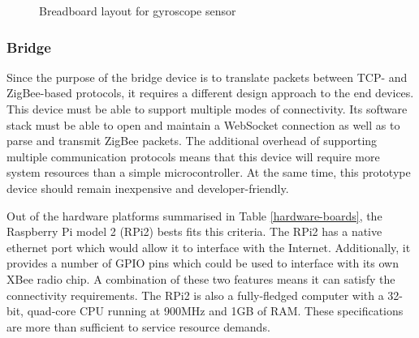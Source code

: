         \begin{figure}
          \centering
          \caption{Breadboard layout for gyroscope sensor}\label{figure:gyroscope-sensor}
        \end{figure}

      \subsubsection{Bridge}
        Since the purpose of the bridge device is to translate packets between TCP- and ZigBee-based protocols, it requires a different design approach to the end devices. This device must be able to support multiple modes of connectivity. Its software stack must be able to open and maintain a WebSocket connection as well as to parse and transmit ZigBee packets. The additional overhead of supporting multiple communication protocols means that this device will require more system resources than a simple microcontroller. At the same time, this prototype device should remain inexpensive and developer-friendly.

        Out of the hardware platforms summarised in Table \ref{hardware-boards}, the Raspberry Pi  model 2 (RPi2) bests fits this criteria. The RPi2 has a native ethernet port which would allow it to interface with the Internet. Additionally, it provides a number of GPIO pins which could be used to interface with its own XBee radio chip. A combination of these two features means it can satisfy the connectivity requirements. The RPi2 is also a fully-fledged computer with a 32-bit, quad-core CPU running at 900MHz and 1GB of RAM. These specifications are more than sufficient to service resource demands.

